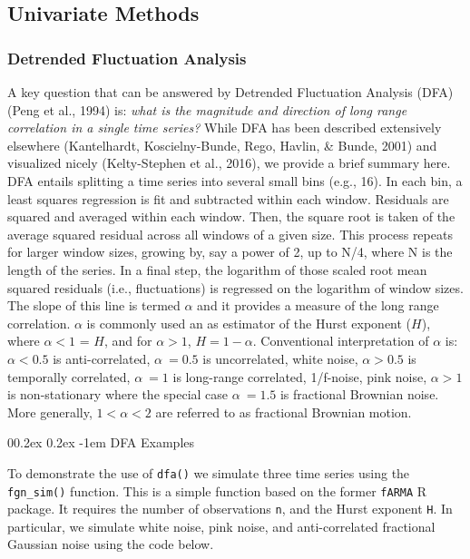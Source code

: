 \documentclass[
  man]{apa6}
\makeatletter
\let\oldparagraph\paragraph
\renewcommand{\paragraph}[1]{\oldparagraph{#1}\mbox{}}
\renewcommand{\paragraph}{\@startsection{paragraph}{4}{\parindent}%
  {0\baselineskip \@plus 0.2ex \@minus 0.2ex}%
  {-1em}%
  {\normalfont\normalsize\bfseries\itshape\typesectitle}}
\makeatother
\begin{document}
\hypertarget{univariate-methods}{%
\subsection{Univariate Methods}\label{univariate-methods}}

\hypertarget{detrended-fluctuation-analysis}{%
\subsubsection{Detrended Fluctuation Analysis}\label{detrended-fluctuation-analysis}}

A key question that can be answered by Detrended Fluctuation Analysis
(DFA) (Peng et al., 1994) is: \emph{what is the magnitude and
direction of long range correlation in a single time series?} While DFA
has been described extensively elsewhere
(Kantelhardt, Koscielny-Bunde, Rego, Havlin, \& Bunde, 2001) and visualized nicely
(Kelty-Stephen et al., 2016), we provide a brief
summary here. DFA entails splitting a time series into several small
bins (e.g., 16). In each bin, a least squares regression is fit and
subtracted within each window. Residuals are squared and averaged within
each window. Then, the square root is taken of the average squared
residual across all windows of a given size. This process repeats for
larger window sizes, growing by, say a power of 2, up to N/4, where N is
the length of the series. In a final step, the logarithm of those scaled
root mean squared residuals (i.e., fluctuations) is regressed on the
logarithm of window sizes. The slope of this line is termed \(\alpha\) and
it provides a measure of the long range correlation. \(\alpha\) is
commonly used an as estimator of the Hurst exponent (\(H\)), where
\(\alpha<1\) = \(H\), and for \(\alpha>1\), \(H = 1 - \alpha\). Conventional
interpretation of \(\alpha\) is: \(\alpha < 0.5\) is anti-correlated,
\(\alpha ~= 0.5\) is uncorrelated, white noise, \(\alpha > 0.5\) is
temporally correlated, \(\alpha ~= 1\) is long-range correlated,
1/f-noise, pink noise, \(\alpha > 1\) is non-stationary where the special
case \(\alpha ~= 1.5\) is fractional Brownian noise. More generally,
\(1<\alpha<2\) are referred to as fractional Brownian motion.

\hypertarget{dfa-examples}{%
\paragraph{DFA Examples}\label{dfa-examples}}

To demonstrate the use of \texttt{dfa()} we simulate three time series using
the \texttt{fgn\_sim()} function. This is a simple function based on the former
\texttt{fARMA} R package. It requires the number of observations \texttt{n}, and the
Hurst exponent \texttt{H}. In particular, we simulate white noise, pink noise,
and anti-correlated fractional Gaussian noise using the code below.
\end{document}
